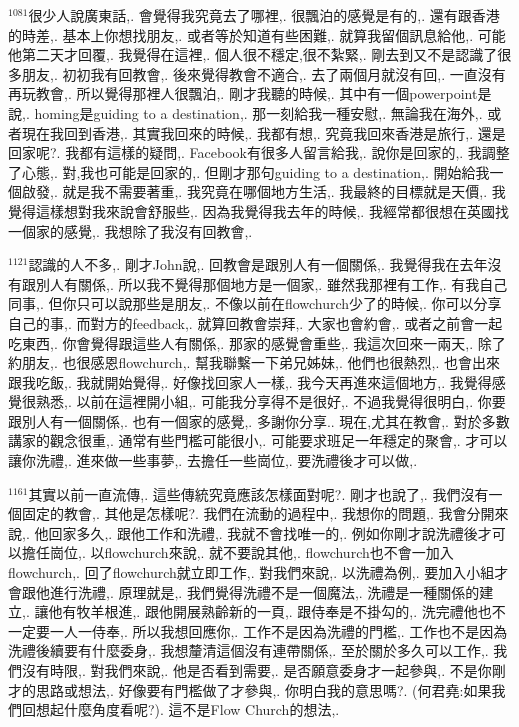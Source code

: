 \documentclass{book}
\begin{document}
$^{1081}$很少人說廣東話,.
會覺得我究竟去了哪裡,.
很飄泊的感覺是有的,.
還有跟香港的時差,.
基本上你想找朋友,.
或者等於知道有些困難,.
就算我留個訊息給他,.
可能他第二天才回覆,.
我覺得在這裡,.
個人很不穩定,很不紮緊,.
剛去到又不是認識了很多朋友,.
初初我有回教會,.
後來覺得教會不適合,.
去了兩個月就沒有回,.
一直沒有再玩教會,.
所以覺得那裡人很飄泊,.
剛才我聽的時候,.
其中有一個powerpoint是說,.
homing是guiding to a destination,.
那一刻給我一種安慰,.
無論我在海外,.
或者現在我回到香港,.
其實我回來的時候,.
我都有想,.
究竟我回來香港是旅行,.
還是回家呢?.
我都有這樣的疑問,.
Facebook有很多人留言給我,.
說你是回家的,.
我調整了心態,.
對,我也可能是回家的,.
但剛才那句guiding to a destination,.
開始給我一個啟發,.
就是我不需要著重,.
我究竟在哪個地方生活,.
我最終的目標就是天價,.
我覺得這樣想對我來說會舒服些,.
因為我覺得我去年的時候,.
我經常都很想在英國找一個家的感覺,.
我想除了我沒有回教會,.

$^{1121}$認識的人不多,.
剛才John說,.
回教會是跟別人有一個關係,.
我覺得我在去年沒有跟別人有關係,.
所以我不覺得那個地方是一個家,.
雖然我那裡有工作,.
有我自己同事,.
但你只可以說那些是朋友,.
不像以前在flowchurch少了的時候,.
你可以分享自己的事,.
而對方的feedback,.
就算回教會崇拜,.
大家也會約會,.
或者之前會一起吃東西,.
你會覺得跟這些人有關係,.
那家的感覺會重些,.
我這次回來一兩天,.
除了約朋友,.
也很感恩flowchurch,.
幫我聯繫一下弟兄姊妹,.
他們也很熱烈,.
也會出來跟我吃飯,.
我就開始覺得,.
好像找回家人一樣,.
我今天再進來這個地方,.
我覺得感覺很熟悉,.
以前在這裡開小組,.
可能我分享得不是很好,.
不過我覺得很明白,.
你要跟別人有一個關係,.
也有一個家的感覺,.
多謝你分享..
現在,尤其在教會,.
對於多數講家的觀念很重,.
通常有些門檻可能很小,.
可能要求班足一年穩定的聚會,.
才可以讓你洗禮,.
進來做一些事夢,.
去擔任一些崗位,.
要洗禮後才可以做,.

$^{1161}$其實以前一直流傳,.
這些傳統究竟應該怎樣面對呢?.
剛才也說了,.
我們沒有一個固定的教會,.
其他是怎樣呢?.
我們在流動的過程中,.
我想你的問題,.
我會分開來說,.
他回家多久,.
跟他工作和洗禮,.
我就不會找唯一的,.
例如你剛才說洗禮後才可以擔任崗位,.
以flowchurch來說,.
就不要說其他,.
flowchurch也不會一加入flowchurch,.
回了flowchurch就立即工作,.
對我們來說,.
以洗禮為例,.
要加入小組才會跟他進行洗禮,.
原理就是,.
我們覺得洗禮不是一個魔法,.
洗禮是一種關係的建立,.
讓他有牧羊根進,.
跟他開展熟齡新的一頁,.
跟侍奉是不掛勾的,.
洗完禮他也不一定要一人一侍奉,.
所以我想回應你,.
工作不是因為洗禮的門檻,.
工作也不是因為洗禮後續要有什麼委身,.
我想釐清這個沒有連帶關係,.
至於關於多久可以工作,.
我們沒有時限,.
對我們來說,.
他是否看到需要,.
是否願意委身才一起參與,.
不是你剛才的思路或想法,.
好像要有門檻做了才參與,.
你明白我的意思嗎?.
(何君堯:如果我們回想起什麼角度看呢?).
這不是Flow Church的想法,.
\end{document}

